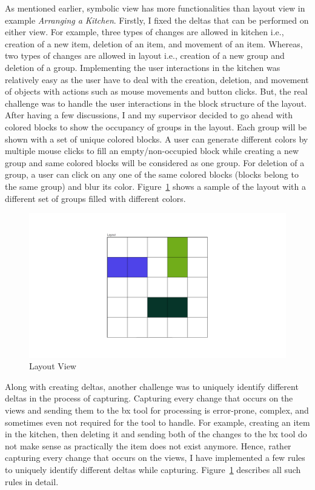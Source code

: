 As mentioned earlier, symbolic view has more functionalities than layout view in example \textit{Arranging a Kitchen}. Firstly, I fixed the deltas that can be performed on either view. For example, three types of changes are allowed in kitchen i.e., creation of a new item, deletion of an item, and movement of an item. Whereas, two types of changes are allowed in layout i.e., creation of a new group and deletion of a group. Implementing the user interactions in the kitchen was relatively easy as the user have to deal with the creation, deletion, and movement of objects with actions such as mouse movements and button clicks. But, the real challenge was to handle the user interactions in the block structure of the layout. After having a few discussions, I and my supervisor decided to go ahead with colored blocks to show the occupancy of groups in the layout. Each group will be shown with a set of unique colored blocks. A user can generate different colors by multiple mouse clicks to fill an empty/non-occupied block while creating a new group and same colored blocks will be considered as one group. For deletion of a group, a user can click on any one of the same colored blocks (blocks belong to the same group) and blur its color. Figure~\ref{fig:Layout} shows a sample of the layout with a different set of groups filled with different colors.

\begin{figure}
	\includegraphics[width=1\textwidth]{figures/layout}
	\caption{Layout View}
	\label{fig:Layout}
\end{figure}

Along with creating deltas, another challenge was to uniquely identify different deltas in the process of capturing. Capturing every change that occurs on the views and sending them to the bx tool for processing is error-prone, complex, and sometimes even not required for the tool to handle. For example, creating an item in the kitchen, then deleting it and sending both of the changes to the bx tool do not make sense as practically the item does not exist anymore. Hence, rather capturing every change that occurs on the views, I have implemented a few rules to uniquely identify different deltas while capturing. Figure~\ref{fig:Layout} describes all such rules in detail.

